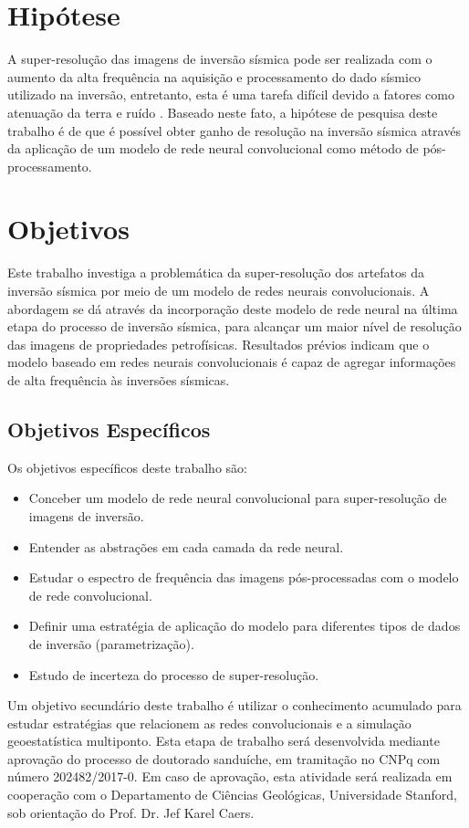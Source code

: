\section{Hipótese}
A super-resolução das imagens de inversão sísmica pode ser realizada com o aumento da alta frequência na aquisição e
processamento do dado sísmico utilizado na inversão, entretanto, esta é uma tarefa difícil
devido a fatores como atenuação da terra e ruído \citep{Xiaoyu2012}.
Baseado neste fato, a hipótese de pesquisa deste trabalho é de que é possível obter ganho de resolução
na inversão sísmica através da aplicação de um modelo de rede neural convolucional como método de pós-processamento.

\section{Objetivos}

Este trabalho investiga a problemática da super-resolução dos artefatos da inversão sísmica
por meio de um modelo de redes neurais convolucionais.
A abordagem se dá através da incorporação deste modelo de rede neural na última
etapa do processo de inversão sísmica, para alcançar um maior nível de
resolução das imagens de propriedades petrofísicas.
Resultados prévios indicam que o modelo baseado em redes neurais convolucionais é capaz
de agregar informações de alta frequência às inversões sísmicas.

\subsection{Objetivos Específicos}
Os objetivos específicos deste trabalho são:
\begin{itemize}
 \item Conceber um modelo de rede neural convolucional para super-resolução de imagens de inversão.
 \item Entender as abstrações em cada camada da rede neural.
 \item Estudar o espectro de frequência das imagens pós-processadas com o modelo de rede convolucional.
 \item Definir uma estratégia de aplicação do modelo para diferentes tipos de dados de inversão (parametrização).
 \item Estudo de incerteza do processo de super-resolução.
\end{itemize}

Um objetivo secundário deste trabalho é utilizar o conhecimento acumulado para estudar estratégias que
relacionem as redes convolucionais e a simulação geoestatística multiponto. Esta etapa de trabalho será desenvolvida
mediante aprovação do processo de doutorado sanduíche, em tramitação no CNPq com número 202482/2017-0.
Em caso de aprovação, esta atividade será realizada em cooperação com o Departamento
de Ciências Geológicas, Universidade Stanford, sob orientação do Prof. Dr. Jef Karel Caers.

